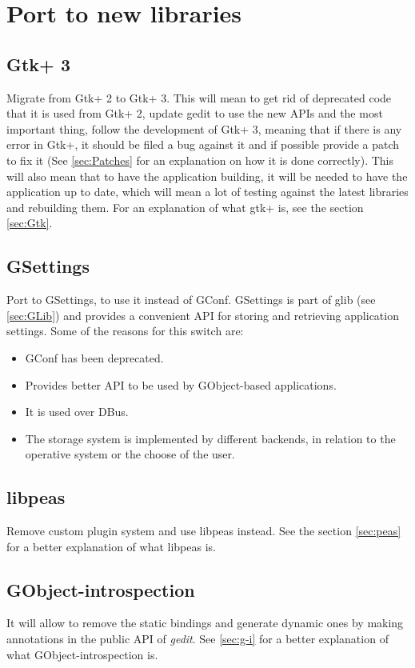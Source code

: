 
\section{Port to new libraries}\label{sec:NewLibraries}

\subsection{Gtk+ 3}\label{sec:Gtk3}

Migrate from Gtk+ 2 to Gtk+ 3. This will mean to get rid of deprecated code that it is used from Gtk+ 2, update gedit to use the new APIs and the most important thing, follow the development of Gtk+ 3, meaning that if there is any error in Gtk+, it should be filed a bug against it and if possible provide a patch to fix it (See \ref{sec:Patches} for an explanation on how it is done correctly). This will also mean that to have the application building, it will be needed to have the application up to date, which will mean a lot of testing against the latest libraries and rebuilding them. For an explanation of what gtk+ is, see the section \ref{sec:Gtk}.

\subsection[GSettings]{GSettings\cite{website:gio}}\label{sec:GSettings}

Port to GSettings, to use it instead of GConf. GSettings is part of glib (see \ref{sec:GLib}) and provides a convenient API for storing and retrieving application settings. Some of the reasons for this switch are:
\begin{itemize}
  \item GConf has been deprecated.
  \item Provides better API to be used by GObject-based applications.
  \item It is used over DBus.
  \item The storage system is implemented by different backends, in relation to the operative system or the choose of the user.
\end{itemize}

\subsection{libpeas}\label{sec:libpeas}

Remove custom plugin system and use libpeas instead. See the section \ref{sec:peas} for a better explanation of what libpeas is.

\subsection{GObject-introspection}\label{sec:GObjectIntrospection}

It will allow to remove the static bindings and generate dynamic ones by making annotations in the public API of \emph{gedit}. See \ref{sec:g-i} for a better explanation of what GObject-introspection is.
